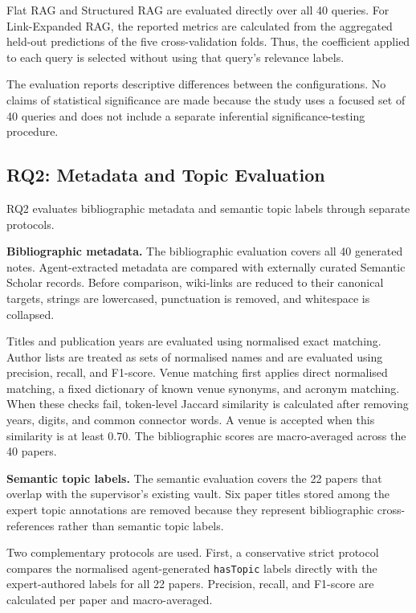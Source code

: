 \documentclass[runningheads]{llncs}
\begin{document}
Flat RAG and Structured RAG are evaluated directly over all 40 queries.
For Link-Expanded RAG, the reported metrics are calculated from the
aggregated held-out predictions of the five cross-validation folds.
Thus, the coefficient applied to each query is selected without using
that query's relevance labels.

The evaluation reports descriptive differences between the
configurations. No claims of statistical significance are made because
the study uses a focused set of 40 queries and does not include a
separate inferential significance-testing procedure.

\subsection{RQ2: Metadata and Topic Evaluation}
\label{sec:rq2_method}

RQ2 evaluates bibliographic metadata and semantic topic labels through
separate protocols.

\noindent\textbf{Bibliographic metadata.}
The bibliographic evaluation covers all 40 generated notes.
Agent-extracted metadata are compared with externally curated Semantic
Scholar records. Before comparison, wiki-links are reduced to their
canonical targets, strings are lowercased, punctuation is removed, and
whitespace is collapsed.

Titles and publication years are evaluated using normalised exact
matching. Author lists are treated as sets of normalised names and are
evaluated using precision, recall, and F1-score. Venue matching first
applies direct normalised matching, a fixed dictionary of known venue
synonyms, and acronym matching. When these checks fail, token-level
Jaccard similarity is calculated after removing years, digits, and
common connector words. A venue is accepted when this similarity is at
least \(0.70\). The bibliographic scores are macro-averaged across the
40 papers.

\noindent\textbf{Semantic topic labels.}
The semantic evaluation covers the 22 papers that overlap with the
supervisor's existing vault. Six paper titles stored among the expert
topic annotations are removed because they represent bibliographic
cross-references rather than semantic topic labels.

Two complementary protocols are used. First, a conservative strict
protocol compares the normalised agent-generated \texttt{hasTopic}
labels directly with the expert-authored labels for all 22 papers.
Precision, recall, and F1-score are calculated per paper and
macro-averaged.
\end{document}
